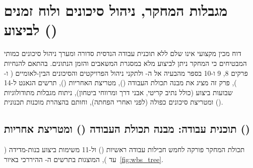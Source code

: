 
\chapter{מגבלות המחקר, ניהול סיכונים ולוח זמנים לביצוע ()}
\label{ch:risks_and_gantt}

דוח מכין מקצועי אינו שלם ללא תוכנית עבודה הנדסית סדורה ומערך ניהול סיכונים כמותי המבטיחים כי המחקר ניתן לביצוע מלא במסגרת המשאבים והזמן הנתונים. בהתאם להנחיות פרקים \num{8}, \num{9} ו-\num{10} בספר מהבעיה אל ה- \cite{segal2026prep} ולתקני ניהול הפרויקטים והסיכונים הבין-לאומיים ( \cite{pmbok2021} ו- \cite{iso31000}), פרק זה מציג את מבנה תכולת העבודה (), מטריצת האחריות (), תרשים הגאנט ל-\num{14} שבועות ביצוע (כולל נתיב קריטי, אבני דרך ומרווחי ביטחון), ניתוח מגבלות מתודולוגיות ומטריצת סיכונים כפולה (לפני ואחרי הפחתה), וחותם בהצהרת מוכנות תכנונית ().

\section{תוכנית עבודה: מבנה תכולת העבודה () ומטריצת אחריות ()}
\label{sec:wbs_and_raci}

תכולת המחקר פורקה לחמש חבילות עבודה ראשיות () ול-\num{11} משימות ביצוע בנות-מדידה ( עד ), המוצגות בתרשים ה- ההיררכי באיור~\ref{fig:wbs_tree}.

